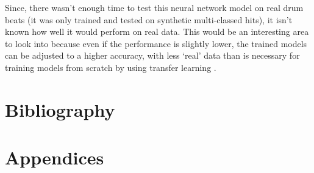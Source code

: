 \documentclass[12pt]{article}
\begin{document}
    Since, there wasn't enough time to test this neural network model on real drum beats (it was only trained and tested on synthetic multi-classed hits), it isn't known how well it would perform on real data. This would be an interesting area to look into because even if the performance is slightly lower, the trained models can be adjusted to a higher accuracy, with less `real' data than is necessary for training models from scratch by using transfer learning \parencite{Asadi2007}.\medskip
    

	\newpage
	\nocite{*}
	\section{Bibliography}
	\medskip
	\printbibliography[notkeyword={figure}, title={References}]
	\printbibliography[type={misc}, keyword={figure}, title={Figures}]
	\newpage
	\section{Appendices}
	
\end{document}
